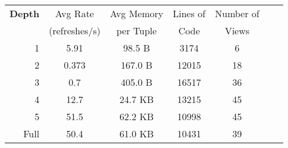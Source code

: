 \begin{tabular}{|r|c|c|c|c|c|c|}\hline
{\bf Depth} & Avg Rate & Avg Memory & Lines of & Number of\\
 & (refreshes/s) & per Tuple & Code & Views\\ \hline
1 & 5.91 & 98.5 B & 3174 &        6 \\ \hline 
2 & 0.373 & 167.0 B & 12015 &       18 \\ \hline 
3 & 0.7 & 405.0 B & 16517 &       36 \\ \hline 
4 & 12.7 & 24.7 KB & 13215 &       45 \\ \hline 
5 & 51.5 & 62.2 KB & 10998 &       45 \\ \hline 
Full & 50.4 & 61.0 KB & 10431 &       39 \\ \hline 
\end{tabular}
